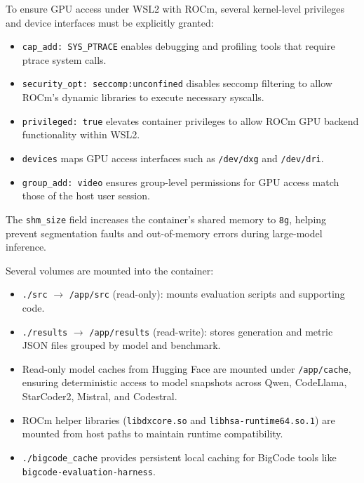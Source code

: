 To ensure GPU access under WSL2 with ROCm, several kernel-level privileges and device interfaces must be explicitly granted:
\begin{itemize}
	\item \texttt{cap\_add: SYS\_PTRACE} enables debugging and profiling tools that require ptrace system calls.
	\item \texttt{security\_opt: seccomp:unconfined} disables seccomp filtering to allow ROCm’s dynamic libraries to execute necessary syscalls.
	\item \texttt{privileged: true} elevates container privileges to allow ROCm GPU backend functionality within WSL2.
	\item \texttt{devices} maps GPU access interfaces such as \texttt{/dev/dxg} and \texttt{/dev/dri}.
	\item \texttt{group\_add: video} ensures group-level permissions for GPU access match those of the host user session.
\end{itemize}

The \texttt{shm\_size} field increases the container’s shared memory to \texttt{8g}, helping prevent segmentation faults and out-of-memory errors during large-model inference.

Several volumes are mounted into the container:
\begin{itemize}
	\item \texttt{./src} $\rightarrow$ \texttt{/app/src} (read-only): mounts evaluation scripts and supporting code.
	\item \texttt{./results} $\rightarrow$ \texttt{/app/results} (read-write): stores generation and metric JSON files grouped by model and benchmark.
	\item Read-only model caches from Hugging Face are mounted under \texttt{/app/cache}, ensuring deterministic access to model snapshots across Qwen, CodeLlama, StarCoder2, Mistral, and Codestral.
	\item ROCm helper libraries (\texttt{libdxcore.so} and \texttt{libhsa-runtime64.so.1}) are mounted from host paths to maintain runtime compatibility.
	\item \texttt{./bigcode\_cache} provides persistent local caching for BigCode tools like \texttt{bigcode-evaluation-harness}.
\end{itemize}

